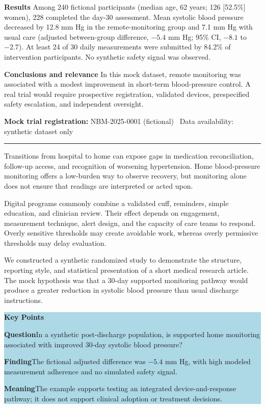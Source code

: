 \documentclass[9pt,twocolumn]{article}
\newcommand{\articleSection}[1]{%
  \par\vspace{5pt}%
  \noindent{\large\bfseries\color{journalblue}#1}\par\vspace{1pt}%
  \noindent\textcolor{journalblue}{\rule{\columnwidth}{0.45pt}}\par\vspace{2pt}%
}
\begin{document}
\textbf{Results} Among 240 fictional participants (median age, 62 years; 126 [52.5\%] women), 228 completed the day-30 assessment. Mean systolic blood pressure decreased by 12.8 mm Hg in the remote-monitoring group and 7.1 mm Hg with usual care (adjusted between-group difference, $-5.4$ mm Hg; 95\% CI, $-8.1$ to $-2.7$). At least 24 of 30 daily measurements were submitted by 84.2\% of intervention participants. No synthetic safety signal was observed.

\textbf{Conclusions and relevance} In this mock dataset, remote monitoring was associated with a modest improvement in short-term blood-pressure control. A real trial would require prospective registration, validated devices, prespecified safety escalation, and independent oversight.

\vspace{3pt}
\noindent\colorbox{softgray}{\parbox{0.94\columnwidth}{\scriptsize\textbf{Mock trial registration:} NBM-2025-0001 (fictional) \textbullet\ Data availability: synthetic dataset only}}

\articleSection{Introduction}

Transitions from hospital to home can expose gaps in medication reconciliation, follow-up access, and recognition of worsening hypertension. Home blood-pressure monitoring offers a low-burden way to observe recovery, but monitoring alone does not ensure that readings are interpreted or acted upon.

Digital programs commonly combine a validated cuff, reminders, simple education, and clinician review. Their effect depends on engagement, measurement technique, alert design, and the capacity of care teams to respond. Overly sensitive thresholds may create avoidable work, whereas overly permissive thresholds may delay evaluation.

We constructed a synthetic randomized study to demonstrate the structure, reporting style, and statistical presentation of a short medical research article. The mock hypothesis was that a 30-day supported monitoring pathway would produce a greater reduction in systolic blood pressure than usual discharge instructions.

\vspace{5pt}
\noindent\colorbox{lightblue}{\parbox{0.93\columnwidth}{\small
\textbf{Key Points}\par\vspace{3pt}
\textbf{Question}\quad In a synthetic post-discharge population, is supported home monitoring associated with improved 30-day systolic blood pressure?\par
\textbf{Finding}\quad The fictional adjusted difference was $-5.4$ mm Hg, with high modeled measurement adherence and no simulated safety signal.\par
\textbf{Meaning}\quad The example supports testing an integrated device-and-response pathway; it does not support clinical adoption or treatment decisions.
}}
\end{document}
